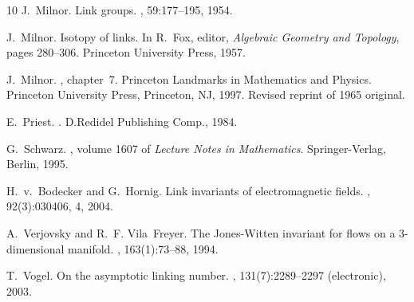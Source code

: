 \documentclass[12pt]{article}
\begin{document}
\begin{thebibliography}{10}
J.~Milnor.
\newblock Link groups.
, 59:177--195, 1954.

J.~Milnor.
\newblock Isotopy of links.
\newblock In R.~Fox, editor, {\em Algebraic Geometry and Topology}, pages
  280--306. Princeton University Press, 1957.

J.~Milnor.
, chapter~7.
\newblock Princeton Landmarks in Mathematics and Physics. Princeton University
  Press, Princeton, NJ, 1997.
\newblock Revised reprint of 1965 original.

E.~Priest.
.
\newblock D.Redidel Publishing Comp., 1984.

G.~Schwarz.
, volume 1607 of {\em Lecture Notes in Mathematics}.
\newblock Springer-Verlag, Berlin, 1995.

H.~v.~Bodecker and G.~Hornig.
\newblock Link invariants of electromagnetic fields.
, 92(3):030406, 4, 2004.

A.~Verjovsky and R.~F. Vila~Freyer.
\newblock The {J}ones-{W}itten invariant for flows on a {$3$}-dimensional
  manifold.
, 163(1):73--88, 1994.

T.~Vogel.
\newblock On the asymptotic linking number.
, 131(7):2289--2297 (electronic), 2003.

\end{thebibliography}
\end{document}
